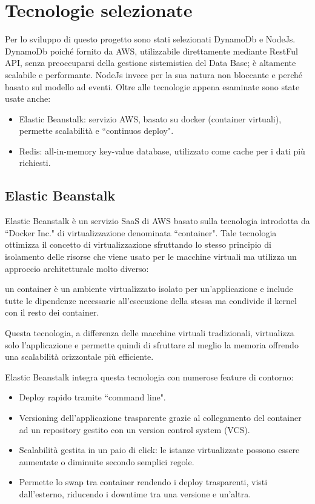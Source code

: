 \section{Tecnologie selezionate}
Per lo sviluppo di questo progetto sono stati selezionati DynamoDb e NodeJs. DynamoDb poiché fornito da AWS, utilizzabile direttamente mediante RestFul API, senza preoccuparsi della gestione sistemistica del Data Base; è altamente scalabile e performante.
NodeJs invece per la sua natura non bloccante e perché basato sul modello ad eventi. Oltre alle tecnologie appena esaminate sono state usate anche:
\begin{itemize}
	\item Elastic Beanstalk: servizio AWS, basato su docker (container virtuali), permette scalabilità e ``continuos deploy". 
	\item Redis: all-in-memory key-value database, utilizzato come cache per i dati più richiesti.
\end{itemize}


\subsection{Elastic Beanstalk}
Elastic Beanstalk è un servizio SaaS di AWS basato sulla tecnologia introdotta da ``Docker Inc." di virtualizzazione denominata ``container". Tale tecnologia ottimizza il concetto di virtualizzazione sfruttando lo stesso principio di isolamento delle risorse che viene usato per le macchine virtuali ma utilizza un approccio architetturale molto diverso: 

un container è un ambiente virtualizzato isolato per un'applicazione e include tutte le dipendenze necessarie all'esecuzione della stessa ma condivide il kernel con il resto dei container. 

Questa tecnologia, a differenza delle macchine virtuali tradizionali, virtualizza solo l'applicazione e permette quindi di sfruttare al meglio la memoria offrendo una scalabilità orizzontale più efficiente.

Elastic Beanstalk integra questa tecnologia con numerose feature di contorno: 
\begin{itemize}
	\item Deploy rapido tramite ``command line".
	\item Versioning dell'applicazione trasparente grazie al collegamento del container ad un repository gestito con un  version control system (VCS).

	\item Scalabilità gestita in un paio di click: le istanze virtualizzate possono essere aumentate o diminuite secondo semplici regole.
	\item Permette lo swap tra container rendendo i deploy trasparenti, visti dall'esterno, riducendo i downtime tra una versione e un'altra.
\end{itemize}

